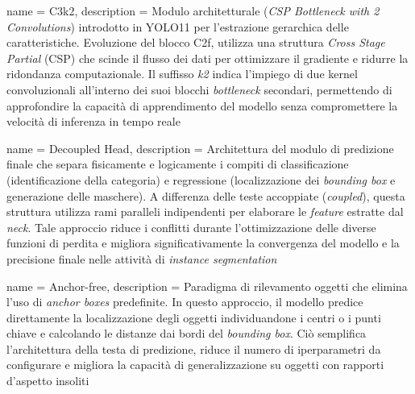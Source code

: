 
{
    name        = {C3k2},
    description = {Modulo architetturale (\textit{CSP Bottleneck with 2 Convolutions}) introdotto in YOLO11 per l'estrazione gerarchica delle caratteristiche. Evoluzione del blocco C2f, utilizza una struttura \textit{Cross Stage Partial} (CSP) che scinde il flusso dei dati per ottimizzare il gradiente e ridurre la ridondanza computazionale. Il suffisso \textit{k2} indica l'impiego di due kernel convoluzionali all'interno dei suoi blocchi \textit{bottleneck} secondari, permettendo di approfondire la capacità di apprendimento del modello senza compromettere la velocità di inferenza in tempo reale}
}

{
    name        = {Decoupled Head},
    description = {Architettura del modulo di predizione finale che separa fisicamente e logicamente i compiti di classificazione (identificazione della categoria) e regressione (localizzazione dei \textit{bounding box} e generazione delle maschere). A differenza delle teste accoppiate (\textit{coupled}), questa struttura utilizza rami paralleli indipendenti per elaborare le \textit{feature} estratte dal \textit{neck}. Tale approccio riduce i conflitti durante l'ottimizzazione delle diverse funzioni di perdita e migliora significativamente la convergenza del modello e la precisione finale nelle attività di \textit{instance segmentation}}
}

{
    name        = {Anchor-free},
    description = {Paradigma di rilevamento oggetti che elimina l'uso di \textit{anchor boxes} predefinite. In questo approccio, il modello predice direttamente la localizzazione degli oggetti individuandone i centri o i punti chiave e calcolando le distanze dai bordi del \textit{bounding box}. Ciò semplifica l'architettura della testa di predizione, riduce il numero di iperparametri da configurare e migliora la capacità di generalizzazione su oggetti con rapporti d'aspetto insoliti}
}

